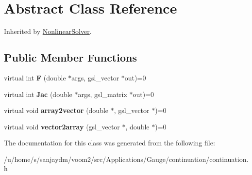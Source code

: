 \hypertarget{class_abstract}{
\section{Abstract Class Reference}
\label{class_abstract}
}


Inherited by \hyperlink{class_nonlinear_solver}{NonlinearSolver}.\subsection*{Public Member Functions}
\begin{DoxyCompactItemize}
\item 
\hypertarget{class_abstract_ad8f2c6a964c90fef26fbd469b2cc17fe}{
virtual int {\bfseries F} (double $\ast$args, gsl\_\-vector $\ast$out)=0}
\label{class_abstract_ad8f2c6a964c90fef26fbd469b2cc17fe}

\item 
\hypertarget{class_abstract_af5a9e461f36d36c527a0c4a148644180}{
virtual int {\bfseries Jac} (double $\ast$args, gsl\_\-matrix $\ast$out)=0}
\label{class_abstract_af5a9e461f36d36c527a0c4a148644180}

\item 
\hypertarget{class_abstract_a268f397a18464ee702767b2413327ccc}{
virtual void {\bfseries array2vector} (double $\ast$, gsl\_\-vector $\ast$)=0}
\label{class_abstract_a268f397a18464ee702767b2413327ccc}

\item 
\hypertarget{class_abstract_a92143c4f3bdb6f8926507fbae0200698}{
virtual void {\bfseries vector2array} (gsl\_\-vector $\ast$, double $\ast$)=0}
\label{class_abstract_a92143c4f3bdb6f8926507fbae0200698}

\end{DoxyCompactItemize}


The documentation for this class was generated from the following file:\begin{DoxyCompactItemize}
\item 
/u/home/s/sanjaydm/voom2/src/Applications/Gauge/continuation/continuation.h\end{DoxyCompactItemize}
